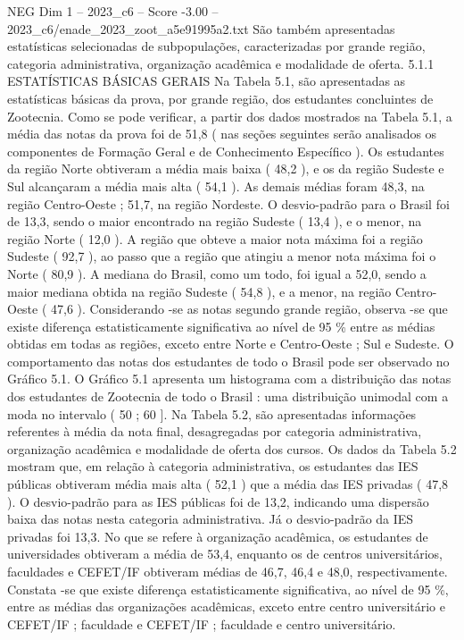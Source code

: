 \begin{textsample}{NEG Dim 1 – 2023\_c6 – Score -3.00 – 2023\_c6/enade\_2023\_zoot\_a5e91995a2.txt}
São também apresentadas estatísticas selecionadas de subpopulações, caracterizadas por grande região, categoria administrativa, organização acadêmica e modalidade de oferta. 5.1.1 ESTATÍSTICAS BÁSICAS GERAIS Na Tabela 5.1, são apresentadas as estatísticas básicas da prova, por grande região, dos estudantes concluintes de Zootecnia.
Como se pode verificar, a partir dos dados mostrados na Tabela 5.1, a média das notas da prova foi de 51,8 ( nas seções seguintes serão analisados os componentes de Formação Geral e de Conhecimento Específico ).
Os estudantes da região Norte obtiveram a média mais baixa ( 48,2 ), e os da região Sudeste e Sul alcançaram a média mais alta ( 54,1 ).
As demais médias foram 48,3, na região Centro-Oeste ; 51,7, na região Nordeste.
O desvio-padrão para o Brasil foi de 13,3, sendo o maior encontrado na região Sudeste ( 13,4 ), e o menor, na região Norte ( 12,0 ).
A região que obteve a maior nota máxima foi a região Sudeste ( 92,7 ), ao passo que a região que atingiu a menor nota máxima foi o Norte ( 80,9 ).
A mediana do Brasil, como um todo, foi igual a 52,0, sendo a maior mediana obtida na região Sudeste ( 54,8 ), e a menor, na região Centro-Oeste ( 47,6 ).
Considerando -se as notas segundo grande região, observa -se que existe diferença estatisticamente significativa ao nível de 95 \% entre as médias obtidas em todas as regiões, exceto entre Norte e Centro-Oeste ; Sul e Sudeste.
O comportamento das notas dos estudantes de todo o Brasil pode ser observado no Gráfico 5.1.
O Gráfico 5.1 apresenta um histograma com a distribuição das notas dos estudantes de Zootecnia de todo o Brasil : uma distribuição unimodal com a moda no intervalo ( 50 ; 60 ].
Na Tabela 5.2, são apresentadas informações referentes à média da nota final, desagregadas por categoria administrativa, organização acadêmica e modalidade de oferta dos cursos.
Os dados da Tabela 5.2 mostram que, em relação à categoria administrativa, os estudantes das IES públicas obtiveram média mais alta ( 52,1 ) que a média das IES privadas ( 47,8 ).
O desvio-padrão para as IES públicas foi de 13,2, indicando uma dispersão baixa das notas nesta categoria administrativa.
Já o desvio-padrão da IES privadas foi 13,3.
No que se refere à organização acadêmica, os estudantes de universidades obtiveram a média de 53,4, enquanto os de centros universitários, faculdades e CEFET/IF obtiveram médias de 46,7, 46,4 e 48,0, respectivamente.
Constata -se que existe diferença estatisticamente significativa, ao nível de 95 \%, entre as médias das organizações acadêmicas, exceto entre centro universitário e CEFET/IF ; faculdade e CEFET/IF ; faculdade e centro universitário.

\end{textsample}
